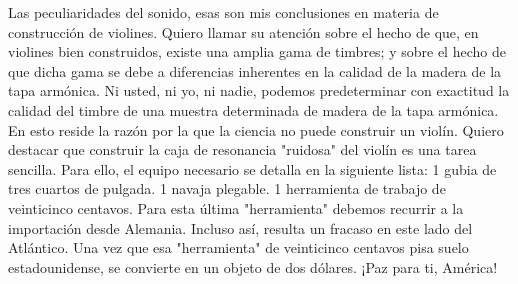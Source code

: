 Las peculiaridades del sonido, esas son mis conclusiones en materia de construcción de violines.
Quiero llamar su atención sobre el hecho de que, en violines bien construidos, existe una amplia gama de timbres; y sobre el hecho de que dicha gama se debe a diferencias inherentes en la calidad de la madera de la tapa armónica. Ni usted, ni yo, ni nadie, podemos predeterminar con exactitud la calidad del timbre de una muestra determinada de madera de la tapa armónica. En esto reside la razón por la que la ciencia no puede construir un violín.
Quiero destacar que construir la caja de resonancia "ruidosa" del violín es una tarea sencilla. Para ello, el equipo necesario se detalla en la siguiente lista:
1 gubia de tres cuartos de pulgada. 1 navaja plegable. 1 herramienta de trabajo de veinticinco centavos.
Para esta última "herramienta" debemos recurrir a la importación desde Alemania. Incluso así, resulta un fracaso en este lado del Atlántico. Una vez que esa "herramienta" de veinticinco centavos pisa suelo estadounidense, se convierte en un objeto de dos dólares.
¡Paz para ti, América!
